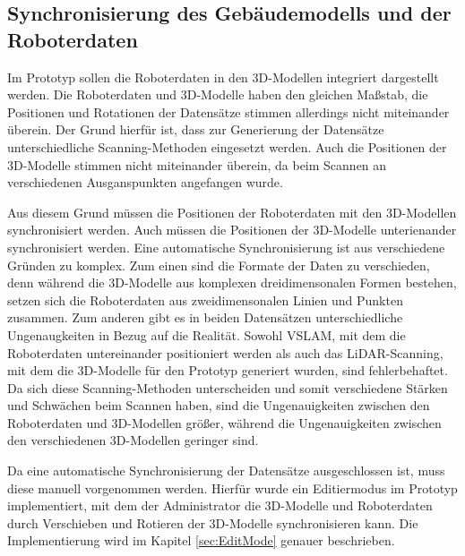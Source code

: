\subsection{Synchronisierung des Gebäudemodells und der Roboterdaten}
Im Prototyp sollen die Roboterdaten in den 3D-Modellen integriert dargestellt werden. Die Roboterdaten und 3D-Modelle haben den gleichen Maßstab, die Positionen und Rotationen der Datensätze stimmen allerdings nicht miteinander überein. Der Grund hierfür ist, dass zur Generierung der Datensätze unterschiedliche Scanning-Methoden eingesetzt werden. Auch die Positionen der 3D-Modelle stimmen nicht miteinander überein, da beim Scannen an verschiedenen Ausganspunkten angefangen wurde.

Aus diesem Grund müssen die Positionen der Roboterdaten mit den 3D-Modellen synchronisiert werden. Auch müssen die Positionen der 3D-Modelle unterienander synchronisiert werden. Eine automatische Synchronisierung ist aus verschiedene Gründen zu komplex. Zum einen sind die Formate der Daten zu verschieden, denn während die 3D-Modelle aus komplexen dreidimensonalen Formen bestehen, setzen sich die Roboterdaten aus zweidimensonalen Linien und Punkten zusammen. Zum anderen gibt es in beiden Datensätzen unterschiedliche Ungenaugkeiten in Bezug auf die Realität. Sowohl \ac{VSLAM}, mit dem die Roboterdaten untereinander positioniert werden als auch das \ac{LiDAR}-Scanning, mit dem die 3D-Modelle für den Prototyp generiert wurden, sind fehlerbehaftet. Da sich diese Scanning-Methoden unterscheiden und somit verschiedene Stärken und Schwächen beim Scannen haben, sind die Ungenauigkeiten zwischen den Roboterdaten und 3D-Modellen größer, während die Ungenauigkeiten zwischen den verschiedenen 3D-Modellen geringer sind.

Da eine automatische Synchronisierung der Datensätze ausgeschlossen ist, muss diese manuell vorgenommen werden. Hierfür wurde ein Editiermodus im Prototyp implementiert, mit dem der Administrator die 3D-Modelle und Roboterdaten durch Verschieben und Rotieren der 3D-Modelle synchronisieren kann. Die Implementierung wird im Kapitel \ref{sec:EditMode} genauer beschrieben.
